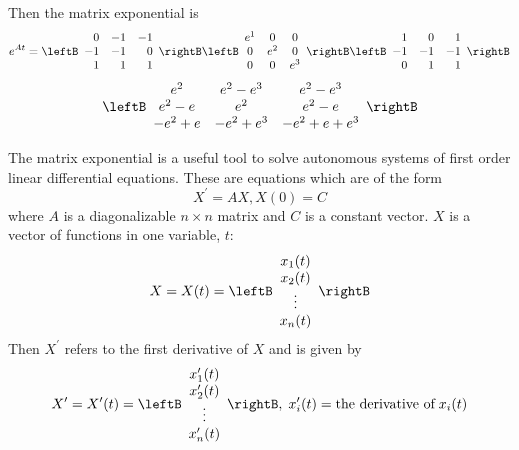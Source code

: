 \begin{solution}
Then the matrix exponential is 
\begin{equation*}
e^{At} = \leftB 
\begin{array}{rrr}
0 & -1 & -1 \\ 
-1 & -1 & 0 \\ 
1 & 1 & 1
\end{array}
\rightB \leftB 
\begin{array}{ccc}
e^{1} & 0 & 0 \\ 
0 & e^{2} & 0 \\ 
0 & 0 & e^{3}
\end{array}
\rightB \leftB 
\begin{array}{rrr}
1 & 0 & 1 \\ 
-1 & -1 & -1 \\ 
0 & 1 & 1
\end{array}
\rightB
\end{equation*}
\begin{equation*}
\leftB 
\begin{array}{ccc}
e^{2} & e^{2}-e^{3} & e^{2}-e^{3} \\ 
e^{2}-e & e^{2} & e^{2}-e \\ 
-e^{2}+e & -e^{2}+e^{3} & -e^{2}+e+e^{3}
\end{array}
\rightB 
\end{equation*}
\end{solution}

The matrix exponential is a useful tool to solve autonomous
systems of first order linear differential equations. These are equations
which are of the form 
\begin{equation*}
X^{\prime }=AX, X(0) = C
\end{equation*}
where $A $ is a diagonalizable $n\times n$ matrix and $C$ is a constant vector. $X$ is a vector of functions in one variable, $t$:
\begin{equation*}
X = X(t) = \leftB \begin{array}{c}
x_1(t) \\
x_2(t) \\
\vdots \\
x_n(t) 
\end{array}
\rightB
\end{equation*}
Then $X^{\prime }$ refers to the first derivative of $X$ and is given by 
\begin{equation*}
X^{\prime} = X^{\prime}(t) = \leftB \begin{array}{c}
x_1^{\prime}(t) \\
x_2^{\prime}(t) \\
\vdots \\
x_n^{\prime}(t) 
\end{array}
\rightB, \; x_i^{\prime}(t) = \text{the derivative of}\; x_i(t)
\end{equation*}

